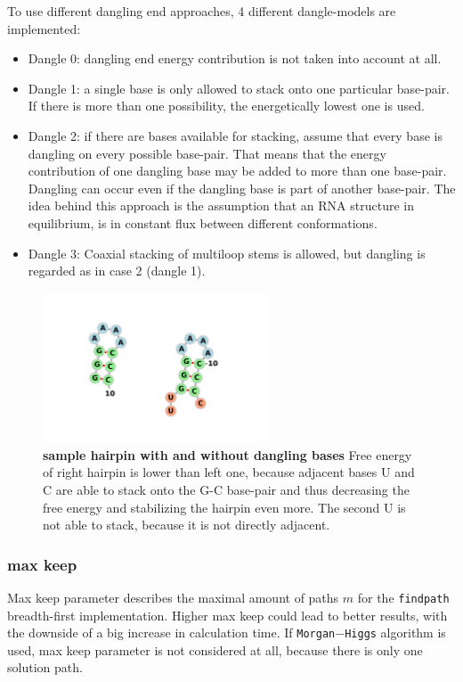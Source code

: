 \documentclass[ twoside,openright,titlepage,numbers=noenddot,headinclude,%
                footinclude=false, cleardoublepage=empty,abstractoff, %
                BCOR=5mm,paper=a4,fontsize=11pt,%
                ngerman,american,%
                ]{scrreprt}
\begin{document}
To use different dangling end approaches, 4 different dangle-models are implemented:

\begin{itemize}
	\item Dangle 0: dangling end energy contribution is not taken into account at all.
	\item Dangle 1: a single base is only allowed to stack onto one particular base-pair. If there is more than one possibility, the energetically lowest one is used.
	\item Dangle 2: if there are bases available for stacking, assume
          that every base is dangling on every possible base-pair. That
          means that the energy contribution of one dangling base may be added to more than one base-pair. Dangling can occur even if the dangling base is part of another base-pair. The idea behind this approach is the assumption that an RNA structure in equilibrium, is in constant flux between different conformations.
	\item Dangle 3: Coaxial stacking of multiloop stems is allowed, but
          dangling is regarded as in case 2 (dangle 1).
	
\end{itemize} 

\begin{figure}
	\includegraphics[width=0.6\textwidth]{./pictures/dangling/dangling.png}
	\caption{{\bf sample hairpin with and without dangling bases}
	Free energy of right hairpin is lower than left one, because adjacent bases U and C are able to stack onto the G-C base-pair and thus decreasing the free energy and stabilizing the hairpin even more. The second U is not able to stack, because it is not directly adjacent.}
	\label{fig:dangling}
\end{figure}


\FloatBarrier



\subsubsection{max keep}
Max keep parameter describes the maximal amount of paths $m$ for the \texttt{findpath} breadth-first implementation. Higher max keep could lead to better results, with the downside of a big increase in calculation time. If \texttt{Morgan$-$Higgs} algorithm is used, max keep parameter is not considered at all, because there is only one solution path.
 
\end{document}
